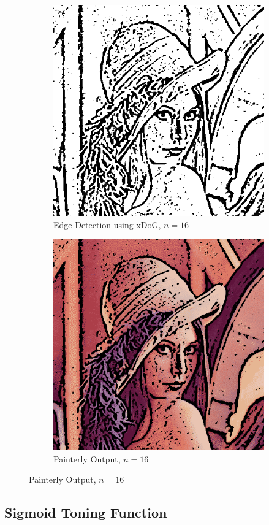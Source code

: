 \documentclass{article}
\begin{document}
\begin{figure}[!ht]
\begin{subfigure}{.5\textwidth}
\centering
\includegraphics[width=.75\linewidth]{xdog16.png}
\caption{Edge Detection using xDoG, $n = 16$}
\end{subfigure}
\begin{subfigure}{.5\textwidth}
\centering
\includegraphics[width=.75\linewidth]{pastel16.png}
\caption{Painterly Output, $n = 16$}
\end{subfigure}
\end{figure}

\clearpage

\subsection{Sigmoid Toning Function}
\end{document}
